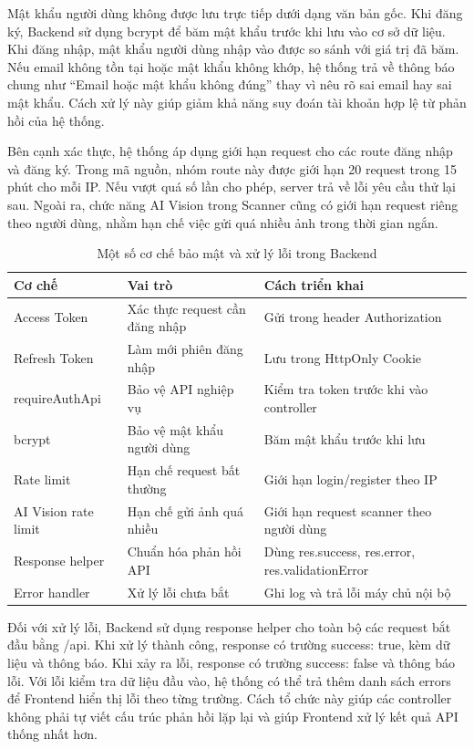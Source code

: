 Mật khẩu người dùng không được lưu trực tiếp dưới dạng văn bản gốc. Khi đăng ký, Backend sử dụng bcrypt để băm mật khẩu trước khi lưu vào cơ sở dữ liệu. Khi đăng nhập, mật khẩu người dùng nhập vào được so sánh với giá trị đã băm. Nếu email không tồn tại hoặc mật khẩu không khớp, hệ thống trả về thông báo chung như “Email hoặc mật khẩu không đúng” thay vì nêu rõ sai email hay sai mật khẩu. Cách xử lý này giúp giảm khả năng suy đoán tài khoản hợp lệ từ phản hồi của hệ thống.

Bên cạnh xác thực, hệ thống áp dụng giới hạn request cho các route đăng nhập và đăng ký. Trong mã nguồn, nhóm route này được giới hạn 20 request trong 15 phút cho mỗi IP. Nếu vượt quá số lần cho phép, server trả về lỗi yêu cầu thử lại sau. Ngoài ra, chức năng AI Vision trong Scanner cũng có giới hạn request riêng theo người dùng, nhằm hạn chế việc gửi quá nhiều ảnh trong thời gian ngắn.

\begin{table}[H]
\centering
\caption{Một số cơ chế bảo mật và xử lý lỗi trong Backend}
\begin{tabular}{|p{4cm}|p{5.5cm}|p{5.5cm}|}
\hline
\textbf{Cơ chế} & \textbf{Vai trò} & \textbf{Cách triển khai} \\ \hline
Access Token & Xác thực request cần đăng nhập & Gửi trong header Authorization \\ \hline
Refresh Token & Làm mới phiên đăng nhập & Lưu trong HttpOnly Cookie \\ \hline
requireAuthApi & Bảo vệ API nghiệp vụ & Kiểm tra token trước khi vào controller \\ \hline
bcrypt & Bảo vệ mật khẩu người dùng & Băm mật khẩu trước khi lưu \\ \hline
Rate limit & Hạn chế request bất thường & Giới hạn login/register theo IP \\ \hline
AI Vision rate limit & Hạn chế gửi ảnh quá nhiều & Giới hạn request scanner theo người dùng \\ \hline
Response helper & Chuẩn hóa phản hồi API & Dùng res.success, res.error, res.validationError \\ \hline
Error handler & Xử lý lỗi chưa bắt & Ghi log và trả lỗi máy chủ nội bộ \\ \hline
\end{tabular}
\end{table}

Đối với xử lý lỗi, Backend sử dụng response helper cho toàn bộ các request bắt đầu bằng /api. Khi xử lý thành công, response có trường success: true, kèm dữ liệu và thông báo. Khi xảy ra lỗi, response có trường success: false và thông báo lỗi. Với lỗi kiểm tra dữ liệu đầu vào, hệ thống có thể trả thêm danh sách errors để Frontend hiển thị lỗi theo từng trường. Cách tổ chức này giúp các controller không phải tự viết cấu trúc phản hồi lặp lại và giúp Frontend xử lý kết quả API thống nhất hơn.

